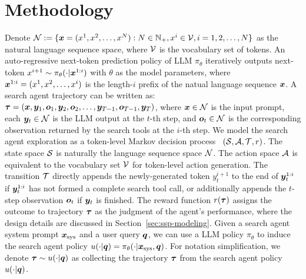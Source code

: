 \documentclass[10pt, a4paper, logo]{googledeepmind} %
\begin{document}
\vspace{-2mm}
\section{Methodology}
\vspace{-2mm}
Denote ${\mathcal{N}} := \{{\bm{x}} = (x^1,x^2,\dots,x^N) : N\in \mathbb{N}_{+}, x^i \in {\mathcal{V}}, i= 1,2,\dots, N\}$ as the natural language sequence space, where ${\mathcal{V}}$ is the vocabulary set of tokens. An auto-regressive next-token prediction policy of LLM $\pi_\theta$ iteratively outputs next-token $x^{i+1} \sim \pi_\theta(\cdot| {\bm{x}}^{1:i})$ with $\theta$ as the model parameters, where ${\bm{x}}^{1:i} = (x^1,x^2,\dots, x^i)$ is the length-$i$ prefix of the natual language sequence ${\bm{x}}$.
%
%
A search agent trajectory can be written as: ${\bm{\tau}} = ({\bm{x}}, {\bm{y}}_1, {\bm{o}}_1, {\bm{y}}_2, {\bm{o}}_2, \dots, {\bm{y}}_{T-1}, {\bm{o}}_{T-1}, {\bm{y}}_T)$, where ${\bm{x}} \in {\mathcal{N}}$ is the input prompt, each ${\bm{y}}_t \in {\mathcal{N}}$ is the LLM output at the $t$-th step, and ${\bm{o}}_t \in {\mathcal{N}}$ is the corresponding observation returned by the search tools at the $i$-th step. We model the search agent exploration as a token-level Markov decision process~\citep{littman1994markov} $({\mathcal{S}},{\mathcal{A}},{\mathcal{T}},r)$. The state space ${\mathcal{S}}$ is naturally the language sequence space ${\mathcal{N}}$. The action space ${\mathcal{A}}$ is equivalent to the vocabulary set ${\mathcal{V}}$ for token-level action generation. The transition ${\mathcal{T}}$ directly appends the newly-generated token $y_t^{i+1}$ to the end of ${\bm{y}}_t^{1:i}$ if  ${\bm{y}}_t^{1:i}$ has not formed a complete search tool call, or additionally appends the $t$-step observation ${\bm{o}}_{t}$ if ${\bm{y}}_t$ is finished. The reward function $r({\bm{\tau}})$ assigns the outcome to trajectory ${\bm{\tau}}$ as the judgment of the agent's performance, where the design details are discussed in Section~\ref{sec:ssp-modeling}.  Given a search agent system prompt ${\bm{x}}_\text{sys}$ and a user query ${\bm{q}}$, we can use a LLM policy $\pi_\theta$ to induce the search agent policy $u(\cdot|{\bm{q}}) = \pi_\theta(\cdot | {\bm{x}}_\text{sys}, {\bm{q}})$. For notation simplification, we denote ${\bm{\tau}} \sim u(\cdot|{\bm{q}})$ as collecting the trajectory ${\bm{\tau}}$ from the search agent policy $u(\cdot|{\bm{q}})$.
\end{document}
